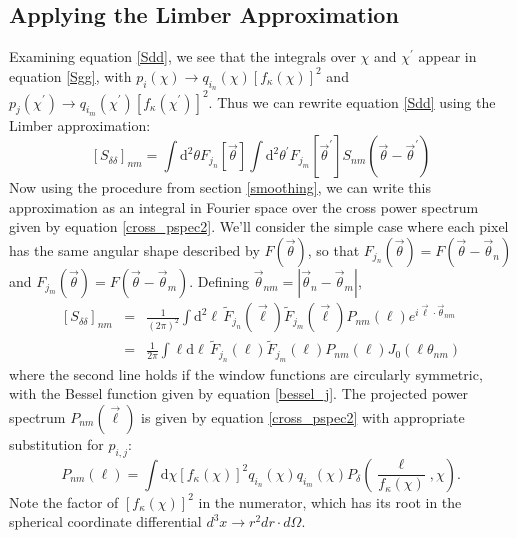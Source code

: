 \documentclass[12pt,preprint]{aastex}			%
\newcommand{\rcom}{\chi}
\newcommand{\dd}{\mathrm{d}}
\begin{document}
\subsection{Applying the Limber Approximation}
Examining equation \ref{Sdd}, we see that the integrals over $\rcom$ and 
$\rcom^\prime$ appear in equation \ref{Sgg}, with 
$p_i(\rcom)\to q_{i_n}(\rcom)[f_\kappa(\rcom)]^2$ and 
$p_j(\rcom^\prime)\to 
q_{i_m}(\rcom^\prime)[f_\kappa(\rcom^\prime)]^2$.
Thus we can rewrite equation \ref{Sdd} using the Limber approximation:
\begin{equation}
  \label{Sdd_Limber}
  \left[S_{\delta\delta}\right]_{nm}
  = \int \dd^2\theta F_{j_n}[\vec{\theta}] 
  \int \dd^2\theta^\prime F_{j_m}[\vec{\theta}^\prime] 
  S_{nm}(\vec\theta -\vec\theta^\prime)
\end{equation}
Now using the procedure from section \ref{smoothing}, 
we can write this approximation as an integral in Fourier 
space over the cross power spectrum given by equation
\ref{cross_pspec2}.  We'll consider the simple case where 
each pixel has the same angular shape described by $F(\vec\theta)$,
so that $F_{j_n}(\vec\theta) = F(\vec\theta-\vec\theta_n)$ and
$F_{j_m}(\vec\theta) = F(\vec\theta-\vec\theta_m)$.  Defining
$\vec\theta_{nm} = |\vec\theta_n - \vec\theta_m|$,
\begin{eqnarray}
  \label{Sdd_final}
  \left[S_{\delta\delta}\right]_{nm} &=& 
  \frac{1}{(2\pi)^2}
  \int \dd^2\ell\, \widetilde{F}_{j_n}(\vec\ell)
  \widetilde{F}_{j_m}(\vec\ell)P_{nm}(\ell)
  e^{i\vec\ell\cdot\vec\theta_{nm}}\nonumber\\
  &=&\frac{1}{2\pi}
  \int \ell\dd\ell\, \widetilde{F}_{j_n}(\ell)
  \widetilde{F}_{j_m}(\ell)P_{nm}(\ell)J_0\left(\ell\theta_{nm}\right)
\end{eqnarray}
where the second line holds if the window functions are circularly symmetric, 
with the Bessel function given by equation \ref{bessel_j}.
The projected power spectrum $P_{nm}(\vec\ell)$ is given by 
equation \ref{cross_pspec2} 
with appropriate substitution for $p_{i,j}$:
\begin{equation}
  P_{nm}(\ell) = \int \dd\rcom[f_\kappa(\rcom)]^2 q_{i_n}(\rcom)q_{i_m}(\rcom)P_\delta\left(\frac{\ell}{f_\kappa(\rcom)},\rcom\right).
\end{equation}
Note the factor of $[f_\kappa(\rcom)]^2$ in the numerator, which has 
its root in the spherical coordinate differential 
$d^3x \to r^2dr \cdot d\Omega$.
\end{document}
